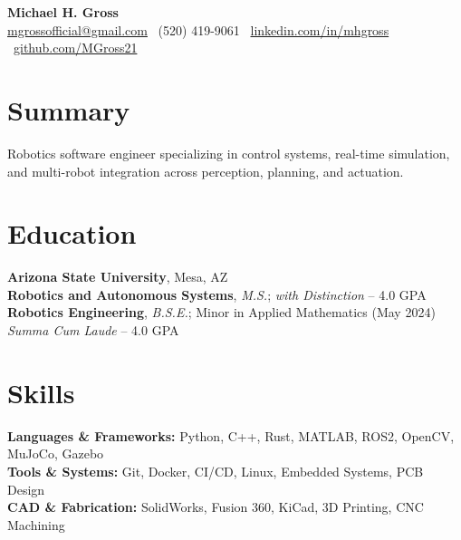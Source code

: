 \documentclass[10pt]{article}
\begin{document}

\begin{center}
    {\LARGE \textbf{Michael H. Gross}} \\
    \href{mailto:mgrossofficial@gmail.com}{mgrossofficial@gmail.com} \textbar\ (520) 419-9061 \textbar\ 
    \href{https://www.linkedin.com/in/mhgross}{linkedin.com/in/mhgross} \textbar\ \href{https://github.com/MGross21}{github.com/MGross21}
\end{center}

\section*{Summary}
Robotics software engineer specializing in control systems, real-time simulation, and multi-robot integration across perception, planning, and actuation.

\section*{Education}
\textbf{Arizona State University}, Mesa, AZ \\
\textbf{Robotics and Autonomous Systems}, \textit{M.S.}; \hfill \textit{with Distinction} -- 4.0 GPA \\
\textbf{Robotics Engineering}, \textit{B.S.E.}; Minor in Applied Mathematics (May 2024) \hfill \textit{Summa Cum Laude} -- 4.0 GPA

\section*{Skills}
\textbf{Languages \& Frameworks:} Python, C++, Rust, MATLAB, ROS2, OpenCV, MuJoCo, Gazebo \\
\textbf{Tools \& Systems:} Git, Docker, CI/CD, Linux, Embedded Systems, PCB Design \\
\textbf{CAD \& Fabrication:} SolidWorks, Fusion 360, KiCad, 3D Printing, CNC Machining
\end{document}
